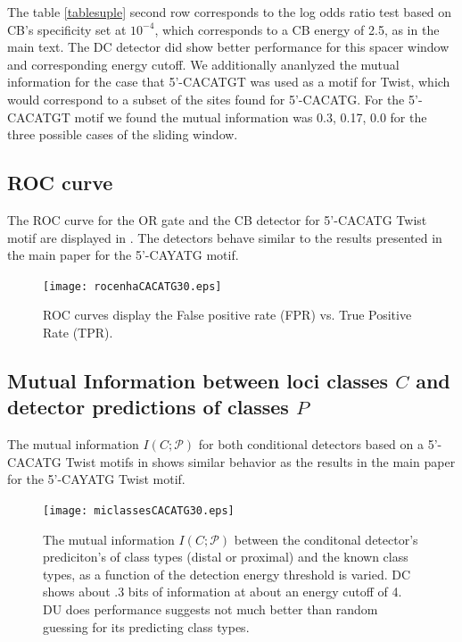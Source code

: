\par

The  table \ref{tablesuple} second row corresponds to the log odds ratio test based on CB's specificity set at $10^{-4}$, which corresponds to a CB energy of 2.5, as in the main text.  The DC detector did show better performance for this spacer window and corresponding energy cutoff.  We additionally ananlyzed the mutual information for the case that 5'-CACATGT was used as a motif for Twist, which would correspond to a subset of the sites found for 5'-CACATG.  For the 5'-CACATGT motif we found the mutual information was 0.3, 0.17, 0.0 for the three possible cases of the sliding window.

\newpage

\subsection{ROC curve}
 The ROC curve for the OR gate and the CB detector for 5'-CACATG Twist motif are displayed in .  The detectors behave similar to the results presented in the main paper for the 5'-CAYATG motif.
\begin{figure}[!htbp]
\texttt{[image: rocenhaCACATG30.eps]}
\caption{ROC curves display the False positive rate (FPR) vs. True Positive Rate (TPR).  }
\end{figure}\label{rocfig2sup}


\newpage

\subsection{ Mutual Information between loci classes $C$ and detector predictions of classes $P$}
The mutual information $I(C;\mathcal P)$ for both conditional detectors based on a 5'-CACATG Twist motifs in  shows similar behavior as the results in the main paper for the 5'-CAYATG Twist motif.   
\begin{figure}[!htbp]
\texttt{[image: miclassesCACATG30.eps]}
\caption{The mutual information $I(C;\mathcal P)$ between the conditonal detector's prediciton's of class types (distal or proximal) and the known class types, as a function of the detection energy threshold is varied.  DC shows about .3 bits of information at about an energy cutoff of 4.  DU does performance suggests not much better than random guessing for its predicting class types.  }
\end{figure}\label{miCPsup}

\newpage
